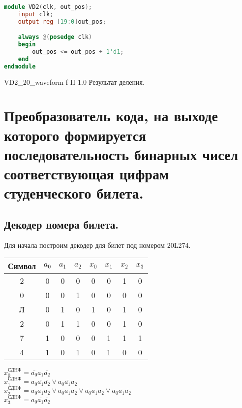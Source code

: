 \documentclass{bmstu}
\begin{document}
	\begin{lstlisting}[language=verilog,escapeinside=``]
module VD2(clk, out_pos);
	input clk;
	output reg [19:0]out_pos;

	always @(posedge clk)
	begin
		out_pos <= out_pos + 1'd1;
	end
endmodule
	\end{lstlisting}
	
	{VD2_20_waveform}
	{f} %
	{H} %
	{1.0\textwidth} %
	{Результат деления.} %
	
	\chapter{Преобразователь кода, на выходе которого формируется
			 последовательность бинарных чисел соответствующая цифрам
			 студенческого билета.}
	
		\section{Декодер номера билета.}
	\begin{flushleft}
		Для начала построим декодер для билет под номером 20L274.
	\end{flushleft}
	
	\begin{center}
		\begin{tabular}{ |c||c|c|c||c|c|c|c| } 
			\hline
			Символ & $a_0$ & $a_1$ & $a_2$ & $x_0$ & $x_1$ & $x_2$ & $x_3$ \\
			\hline
			2 & 0 & 0 & 0 & 0 & 0 & 1 & 0 \\
			0 & 0 & 0 & 1 & 0 & 0 & 0 & 0 \\ 
			Л & 0 & 1 & 0 & 1 & 0 & 1 & 0 \\ 
			2 & 0 & 1 & 1 & 0 & 0 & 1 & 0 \\ 
			7 & 1 & 0 & 0 & 0 & 1 & 1 & 1 \\ 
			4 & 1 & 0 & 1 & 0 & 1 & 0 & 0 \\  
			\hline
		\end{tabular}
	\end{center}
	
	$x_0^{\text{СДНФ}} = \bar{a_0} a_1 \bar{a_2}$ \\
	$x_1^{\text{СДНФ}} = a_0 \bar{a_1} \bar{a_2} \vee a_0 \bar{a_1} a_2$ \\
	$x_2^{\text{СДНФ}} = \bar{a_0} \bar{a_1} \bar{a_2} \vee \bar{a_0} a_1 \bar{a_2} \vee \bar{a_0} a_1 a_2 \vee a_0 \bar{a_1} \bar{a_2}$ \\
	$x_3^{\text{СДНФ}} = a_0 \bar{a_1} \bar{a_2}$ \\
	
\end{document}

